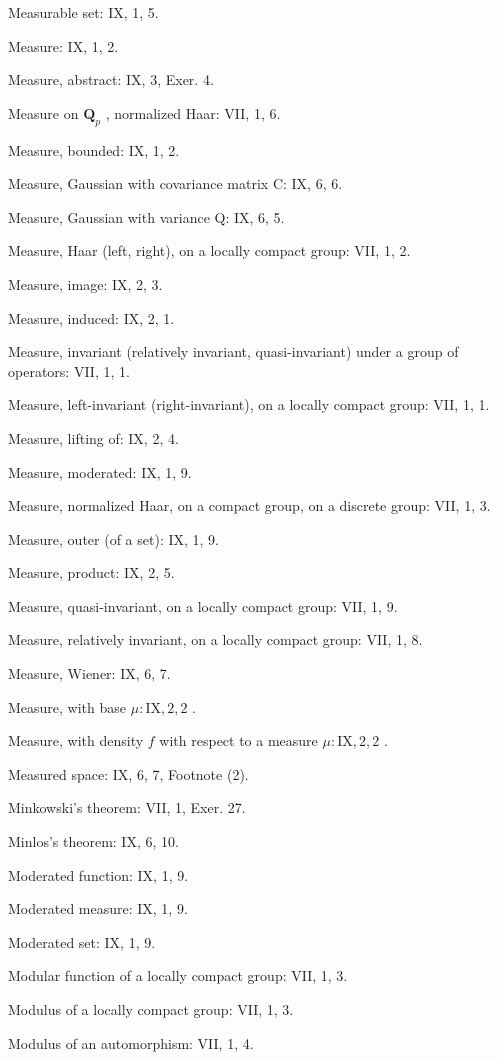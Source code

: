 Measurable set: IX, 1, 5.

Measure: IX, 1, 2.

Measure, abstract: IX, 3, Exer. 4.

Measure on \(\mathbf{Q}_p\) , normalized Haar: VII, 1, 6.

Measure, bounded: IX, 1, 2.

Measure, Gaussian with covariance matrix C: IX, 6, 6.

Measure, Gaussian with variance Q: IX, 6, 5.

Measure, Haar (left, right), on a locally compact group: VII, 1, 2.

Measure, image: IX, 2, 3.

Measure, induced: IX, 2, 1.

Measure, invariant (relatively invariant, quasi-invariant) under a group of operators: VII, 1, 1.

Measure, left-invariant (right-invariant), on a locally compact group: VII, 1, 1.

Measure, lifting of: IX, 2, 4.

Measure, moderated: IX, 1, 9.

Measure, normalized Haar, on a compact group, on a discrete group: VII, 1, 3.

Measure, outer (of a set): IX, 1, 9.

Measure, product: IX, 2, 5.

Measure, quasi-invariant, on a locally compact group: VII, 1, 9.

Measure, relatively invariant, on a locally compact group: VII, 1, 8.

Measure, Wiener: IX, 6, 7.

Measure, with base \(\mu : \mathrm{IX}, 2, 2\) .

Measure, with density \(f\) with respect to a measure \(\mu: \mathrm{IX}, 2, 2\) .

Measured space: IX, 6, 7, Footnote (2).

Minkowski's theorem: VII, 1, Exer. 27.

Minlos's theorem: IX, 6, 10.

Moderated function: IX, 1, 9.

Moderated measure: IX, 1, 9.

Moderated set: IX, 1, 9.

Modular function of a locally compact group: VII, 1, 3.

Modulus of a locally compact group: VII, 1, 3.

Modulus of an automorphism: VII, 1, 4.

